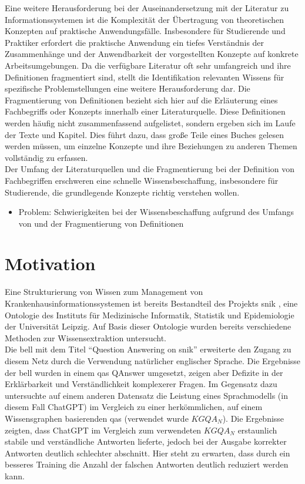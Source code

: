 Eine weitere Herausforderung bei der Auseinandersetzung mit der Literatur zu Informationssystemen ist die Komplexität der Übertragung von theoretischen Konzepten auf praktische Anwendungsfälle.
Insbesondere für Studierende und Praktiker erfordert die praktische Anwendung ein tiefes Verständnis der Zusammenhänge und der Anwendbarkeit der vorgestellten Konzepte auf konkrete Arbeitsumgebungen.
Da die verfügbare Literatur oft sehr umfangreich und ihre Definitionen fragmentiert sind, stellt die Identifikation relevanten Wissens für spezifische Problemstellungen eine weitere Herausforderung dar.
Die Fragmentierung von Definitionen bezieht sich hier auf die Erläuterung eines Fachbegriffs oder Konzepts innerhalb einer Literaturquelle.
Diese Definitionen werden häufig nicht zusammenfassend aufgelistet, sondern ergeben sich im Laufe der Texte und Kapitel.
Dies führt dazu, dass große Teile eines Buches gelesen werden müssen, um einzelne Konzepte und ihre Beziehungen zu anderen Themen vollständig zu erfassen.\\

Der Umfang der Literaturquellen und die Fragmentierung bei der Definition von Fachbegriffen
erschweren eine schnelle Wissensbeschaffung, insbesondere für Studierende, die grundlegende Konzepte richtig verstehen wollen.\\

\begin{itemize}
  \item Problem: Schwierigkeiten bei der Wissensbeschaffung aufgrund des Umfangs von \citet{bb} und der Fragmentierung von Definitionen
\end{itemize}

\section{Motivation}

Eine Strukturierung von Wissen zum Management von Krankenhausinformationssystemen ist bereits Bestandteil des Projekts \ac{snik} \citep{semantischesnetz, domaene},
eine Ontologie des Instituts für Medizinische Informatik, Statistik und Epidemiologie der Universität Leipzig.
Auf Basis dieser Ontologie wurden bereits verschiedene Methoden zur Wissensextraktion untersucht.\\
Die \ac{bell} mit dem Titel \enquote{Question Answering on \ac{snik}} \citep{hannesbell, hannesbell_skill} erweiterte den Zugang zu diesem Netz durch die Verwendung natürlicher englischer Sprache.
Die Ergebnisse der \ac{bell} wurden in einem \ac{qas} QAnswer \citep{qanswer} umgesetzt, zeigen aber Defizite in der Erklärbarkeit und Verständlichkeit komplexerer Fragen.
Im Gegensatz dazu untersuchte \citet{chatgpt_qas} auf einem anderen Datensatz die Leistung eines Sprachmodells (in diesem Fall ChatGPT) im Vergleich zu einer herkömmlichen, auf einem Wissensgraphen basierenden \ac{qas} (verwendet wurde $KGQA_N$).
Die Ergebnisse zeigten, dass ChatGPT im Vergleich zum verwendeten $KGQA_N$ erstaunlich stabile und verständliche Antworten lieferte, jedoch bei der Ausgabe korrekter Antworten deutlich schlechter abschnitt. Hier steht zu erwarten, dass durch ein besseres Training die Anzahl der falschen Antworten deutlich reduziert werden kann.\\

